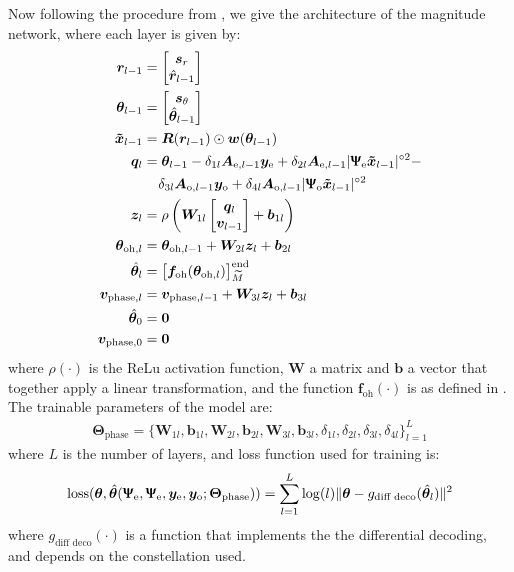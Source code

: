 Now following the procedure from \cite{Neev_2019}, we give the architecture of the magnitude network, where each layer is given by:
\begin{align}
	\bm{r}_{l-1} &= \begin{bmatrix}\bm s_r\\\hat{\bm r}_{l-1}\end{bmatrix}\\
	\bm{\theta}_{l-1} &= \begin{bmatrix}\bm s_\theta\\\hat{\bm \theta}_{l-1}\end{bmatrix}\\
	\bm{\tilde{x}}_{l-1}&=\bm R(\bm{r}_{l-1})\odot\bm w(\bm\theta_{l-1})\\
	\bm q_l& = \bm{\theta}_{l-1} -\delta_{1l}\bm A_{\text{e},l-1}\bm y_\text{e} +\delta_{2l}\bm A_{\text{e},l-1}|\bm{\bm{\Uppsi}_\text{e}\tilde{x}}_{l-1}|^{\circ2}-\nonumber\\
	&\;\;\;\;\delta_{3l}\bm A_{\text{o},l-1}\bm y_\text{o} +\delta_{4l}\bm A_{\text{o},l-1}|\bm{\bm{\Uppsi}_\text{o}\tilde{x}}_{l-1}|^{\circ2}\\
	\bm z_l&=\rho\left( \bm W_{1l}\begin{bmatrix}\bm q_l\\\bm v_{l-1}\end{bmatrix}+\bm b_{1l}\right)\\
	\bm{\theta}_{\text{oh},l} &= \bm{\theta}_{\text{oh},l-1}+\bm W_{2l}\bm z_l+\bm b_{2l}\\
	\hat{\bm{\theta}}_{l} &= \bigl[\bm f_{\text{oh}}(\bm{\theta}_{\text{oh},l})\bigr]_{\widetilde{M}}^{\text{end}}\\
	\bm v_{\text{phase},l}&=\bm v_{\text{phase},l-1}+\bm W_{3l}\bm z_l+\bm b_{3l}\\
	\hat{\bm{\theta}}_{0} &= \bm 0\\
	\bm v_{\text{phase},0}&=\bm 0\\
\end{align}
where $\rho(\cdot)$ is the ReLu activation function, $\bm W$ a matrix and $\bm b$ a vector that together apply a linear transformation, and  the function $\bm f_{\text{oh}}(\cdot)$ is as defined in \cite{Neev_2019}.\\

The trainable parameters of the model are:
\begin{align}
	\bm \Theta_\text{phase} = \bigl\{\bm W_{1l},\bm b_{1l},\bm W_{2l},\bm b_{2l},\bm W_{3l},\bm b_{3l},\delta_{1l},\delta_{2l},\delta_{3l},\delta_{4l}  \bigr\}_{l=1}^L
\end{align}
where $L$ is the number of layers, and loss function used for training is:
\begin{align}
	\text{loss}(\bm \theta, \hat{\bm \theta}(\bm{\Uppsi}_\text{e},\bm{\Uppsi}_\text{e},\bm y_\text{e},\bm y_\text{o};\bm \Theta_\text{phase}))=\sum_{l=1}^L\log(l)\lVert \bm \theta-g_\text{diff deco}(\hat{\bm{\theta}}_{l})\rVert^2
\end{align}
where $g_\text{diff deco}(\cdot)$ is a function that implements the the differential decoding, and depends on the constellation used.





